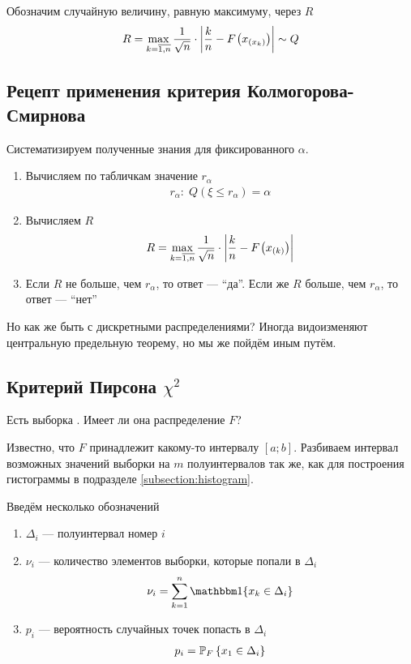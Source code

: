 Обозначим случайную величину, равную максимуму, через $R$
\begin{align*}
  R = \max\limits_{k= \overline{1,n}}{
      \frac{1}{\sqrt{n}} \cdot \left| \frac{k}{n}
      - \cdf{x_{\left( x_k \right)}} \right|}
  \sim Q
\end{align*}

\subsection{Рецепт применения критерия Колмогорова-Смирнова}

Систематизируем полученные знания для фиксированного $\alpha$.

\begin{enumerate}
  \item Вычисляем по табличкам значение $r_{\alpha}$
      \begin{align*}
      r_{\alpha}:\; Q\left( \xi \le r_{\alpha} \right) = \alpha
      \end{align*}
  \item Вычисляем $R$
      \begin{align*}
      R = \max\limits_{k= \overline{1,n}}{
          \frac{1}{\sqrt{n}} \cdot \left| \frac{k}{n}
        - \cdf{x_{\left( k \right)}} \right|}
      \end{align*}
  \item Если $R$ не больше, чем $r_{\alpha}$, то ответ --- ``да''.
      Если же $R$ больше, чем $r_{\alpha}$, то ответ --- ``нет''
\end{enumerate}

Но как же быть с дискретными распределениями? Иногда видоизменяют центральную
предельную теорему, но мы же пойдём иным путём.

\subsection{Критерий Пирсона $\chi^2$}

Есть выборка \xsample. Имеет ли она распределение $F$?

Известно, что $F$ принадлежит какому-то интервалу $\left[ a; b \right]$.
Разбиваем интервал возможных значений выборки на $m$ полуинтервалов
так же, как для построения гистограммы в подразделе \ref{subsection:histogram}.

Введём несколько обозначений
\begin{enumerate}
  \item $\Delta_i$ --- полуинтервал номер $i$
  \item $\nu_i$ --- количество элементов выборки, которые попали в $\Delta_i$
      \begin{align*}
      \nu_i = \sum_{k=1}^{n} \Indicator{x_k \in \Delta_i}
      \end{align*}
  \item $p_i$ --- вероятность случайных точек попасть в $\Delta_i$
      \begin{align*}
      p_i = \Probability[F]{x_1 \in \Delta_i}
      \end{align*}
\end{enumerate}

